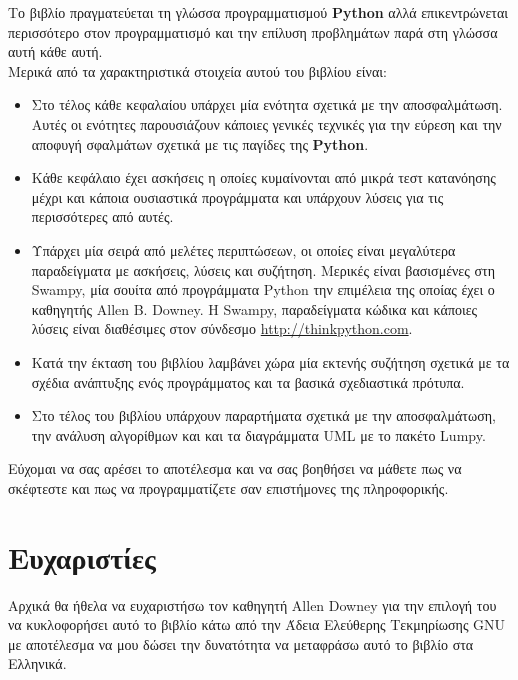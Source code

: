 \documentclass[10pt]{book}
\begin{document}
Το βιβλίο πραγματεύεται τη γλώσσα προγραμματισμού {\bf Python} αλλά επικεντρώνεται περισσότερο στον προγραμματισμό και την επίλυση προβλημάτων παρά στη γλώσσα αυτή κάθε αυτή.\\

Μερικά από τα χαρακτηριστικά στοιχεία αυτού του βιβλίου είναι:

\begin{itemize}

\item Στο τέλος κάθε κεφαλαίου υπάρχει μία ενότητα σχετικά με την αποσφαλμάτωση. Αυτές οι ενότητες 
  παρουσιάζουν κάποιες γενικές τεχνικές για την εύρεση και την αποφυγή σφαλμάτων σχετικά με τις παγίδες 
  της {\bf Python}.

\item Κάθε κεφάλαιο έχει ασκήσεις η οποίες κυμαίνονται από μικρά 
  τεστ κατανόησης μέχρι και κάποια ουσιαστικά προγράμματα και 
  υπάρχουν λύσεις για τις περισσότερες από αυτές.

\item Υπάρχει μία σειρά από μελέτες περιπτώσεων, οι οποίες είναι
  μεγαλύτερα παραδείγματα με ασκήσεις, λύσεις και συζήτηση. Μερικές είναι 
  βασισμένες στη Swampy, μία σουίτα από προγράμματα Python την επιμέλεια 
  της οποίας έχει ο καθηγητής Allen B. Downey. 
  Η Swampy, παραδείγματα κώδικα και κάποιες λύσεις  
  είναι διαθέσιμες στον σύνδεσμο \url{http://thinkpython.com}.
  
\item Κατά την έκταση του βιβλίου λαμβάνει χώρα μία εκτενής συζήτηση σχετικά με τα σχέδια ανάπτυξης 
  ενός προγράμματος και τα βασικά σχεδιαστικά πρότυπα.

\item Στο τέλος του βιβλίου υπάρχουν παραρτήματα σχετικά με την αποσφαλμάτωση, την ανάλυση αλγορίθμων και  
  και τα διαγράμματα UML με το πακέτο Lumpy.

\end{itemize}

Εύχομαι να σας αρέσει το αποτέλεσμα και να σας βοηθήσει να μάθετε πως να σκέφτεστε και πως να προγραμματίζετε σαν επιστήμονες της πληροφορικής.


\section*{Ευχαριστίες}

Αρχικά θα ήθελα να ευχαριστήσω τον καθηγητή Allen Downey για την επιλογή του να κυκλοφορήσει αυτό το 
βιβλίο κάτω από την Άδεια Ελεύθερης Τεκμηρίωσης GNU με αποτέλεσμα να μου δώσει την δυνατότητα να 
μεταφράσω αυτό το βιβλίο στα Ελληνικά.
\end{document}
